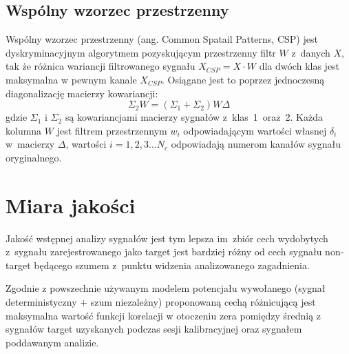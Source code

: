 \documentclass[licencjacka,openright]{pracamgr}
\begin{document}
\subsection{Wspólny wzorzec przestrzenny}
Wspólny wzorzec przestrzenny (ang. Common Spatail Patterns, CSP) \citep{koles1990} jest dyskryminacyjnym algorytmem pozyskującym przestrzenny filtr $W$ z~danych $X$, tak że różnica wariancji filtrowanego sygnału \mbox{$X_{CSP} = X \cdot W$} dla dwóch klas jest maksymalna w pewnym kanale $X_{CSP}$. Osiągane jest to poprzez jednoczesną diagonalizację macierzy kowariancji:
\begin{equation}
\Sigma _2 W = (\Sigma _1 + \Sigma _2 )W \Delta
\end{equation}
gdzie $\Sigma_1$ i $\Sigma_2$ są kowariancjami macierzy sygnałów z~klas~1~oraz~2. Każda kolumna $W$ jest filtrem przestrzennym $w_i$ odpowiadającym wartości własnej $\delta _i$ w~macierzy $\Delta$, wartości $i = 1,2,3 \ldots N_c$ odpowiadają numerom kanałów sygnału oryginalnego.%

\section{Miara jakości}
\label{miara}
Jakość wstępnej analizy sygnałów jest tym lepsza im~zbiór cech wydobytych z~sygnału zarejestrowanego jako target jest bardziej różny od cech sygnału non-target będącego szumem z~punktu widzenia analizowanego zagadnienia.

Zgodnie z powszechnie używanym modelem potencjału wywołanego (sygnał deterministyczny + szum niezależny) proponowaną cechą  różnicującą jest maksymalna wartość funkcji korelacji w otoczeniu zera pomiędzy średnią z sygnałów target uzyskanych podczas sesji kalibracyjnej oraz sygnałem poddawanym analizie.
\end{document}
